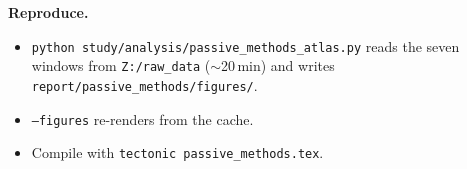 \documentclass[10pt]{article}
\begin{document}
\textbf{Reproduce.}
\begin{itemize}
  \item \texttt{python study/analysis/passive\_methods\_atlas.py} reads the seven windows from
    \texttt{Z:/raw\_data} ($\sim$20\,min) and writes \texttt{report/passive\_methods/figures/}.
  \item \texttt{--figures} re-renders from the cache.
  \item Compile with \texttt{tectonic passive\_methods.tex}.
\end{itemize}
\end{document}
